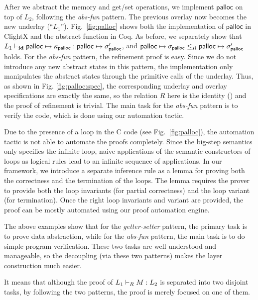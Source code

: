 After we abstract the memory and get/set operations,
we implement $\textsf{palloc}$ on top of $L_2$,
following the {\it abs-fun} pattern.
The previous overlay now becomes the new underlay (``$L_1$'').
Fig.~\ref{fig:palloc} shows both the implementation of
$\textsf{palloc}$ in ClightX and the abstract function in Coq.
As before, we separately show that
$\ltyp{L_1}{\id}%
	{\textsf{palloc} \mapsto \kappa_\textsf{palloc}}%
	{\textsf{palloc} \mapsto \sigma'_\textsf{palloc}}$,
and 
$\textsf{palloc} \mapsto \sigma_\textsf{palloc}\le_{R}
\textsf{palloc} \mapsto \sigma'_\textsf{palloc}$
holds.
For the {\it abs-fun} pattern, the refinement proof is easy.
Since we do not introduce any new abstract states in this pattern,
the implementation only manipulates the abstract states through the
primitive calls of the underlay. Thus, as shown in Fig. \ref{fig:palloc:spec},
the corresponding underlay and overlay specifications are exactly the same,
so the relation $R$ here is the identity (\id) and 
the proof of refinement is trivial.
The main task for the {\it abs-fun}
pattern is to verify the code, which is done using our automation tactic. 


Due to the presence of a loop in the C code (see Fig.~\ref{fig:palloc}), 
the automation tactic is not able to automate the proofs completely.
Since the big-step semantics only specifies the infinite loop,
naive applications of the semantic constructors of loops as
logical rules lead to an infinite sequence of applications.
In our framework, we introduce a separate inference rule as a
lemma for proving both the correctness and the termination of the loops.
The lemma requires the prover to provide both the loop invariants
(for partial correctness) and the loop variant (for termination).
Once the right loop invariants and variant are provided, the proof
can be mostly automated using our proof automation engine.


The above examples show that for the {\it getter-setter} pattern, the
primary task is to prove data abstraction, while for the {\it abs-fun}
pattern, the main task is to do simple program verification.  These
two tasks are well understood and manageable, so the decoupling (via
these two patterns) makes the layer construction much easier. 


It means that although
the proof of $L_1 \vdash_{R} M : L_2$ is separated into two disjoint
tasks, by following the two patterns, the proof is merely focused
on one of them.



